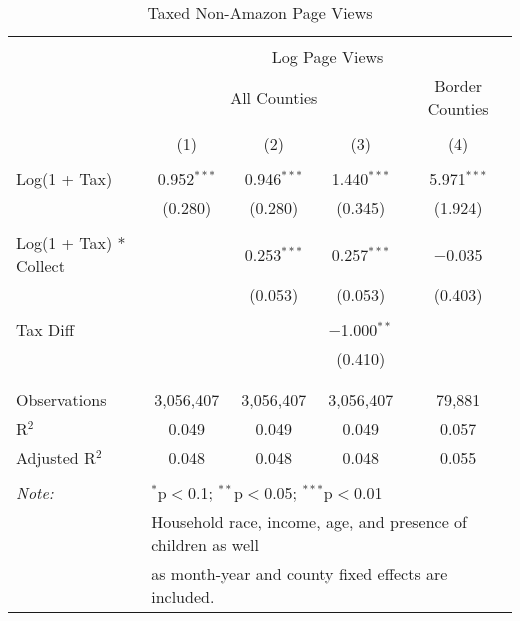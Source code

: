 
\begin{table}[!htbp] \centering 
  \caption{Taxed Non-Amazon Page Views} 
  \label{} 
\begin{tabular}{@{\extracolsep{5pt}}lcccc} 
\\[-1.8ex]\hline 
\hline \\[-1.8ex] 
 & \multicolumn{4}{c}{Log Page Views} \\ 
\cline{2-5} 
 & \multicolumn{3}{c}{All Counties} & Border Counties \\ 
\\[-1.8ex] & (1) & (2) & (3) & (4)\\ 
\hline \\[-1.8ex] 
 Log(1 + Tax) & 0.952$^{***}$ & 0.946$^{***}$ & 1.440$^{***}$ & 5.971$^{***}$ \\ 
  & (0.280) & (0.280) & (0.345) & (1.924) \\ 
  & & & & \\ 
 Log(1 + Tax) * Collect &  & 0.253$^{***}$ & 0.257$^{***}$ & $-$0.035 \\ 
  &  & (0.053) & (0.053) & (0.403) \\ 
  & & & & \\ 
 Tax Diff &  &  & $-$1.000$^{**}$ &  \\ 
  &  &  & (0.410) &  \\ 
  & & & & \\ 
\hline \\[-1.8ex] 
Observations & 3,056,407 & 3,056,407 & 3,056,407 & 79,881 \\ 
R$^{2}$ & 0.049 & 0.049 & 0.049 & 0.057 \\ 
Adjusted R$^{2}$ & 0.048 & 0.048 & 0.048 & 0.055 \\ 
\hline 
\hline \\[-1.8ex] 
\textit{Note:}  & \multicolumn{4}{l}{$^{*}$p$<$0.1; $^{**}$p$<$0.05; $^{***}$p$<$0.01} \\ 
 & \multicolumn{4}{l}{Household race, income, age, and presence of children as well} \\ 
 & \multicolumn{4}{l}{as month-year and county fixed effects are included.} \\ 
\end{tabular} 
\end{table} 
